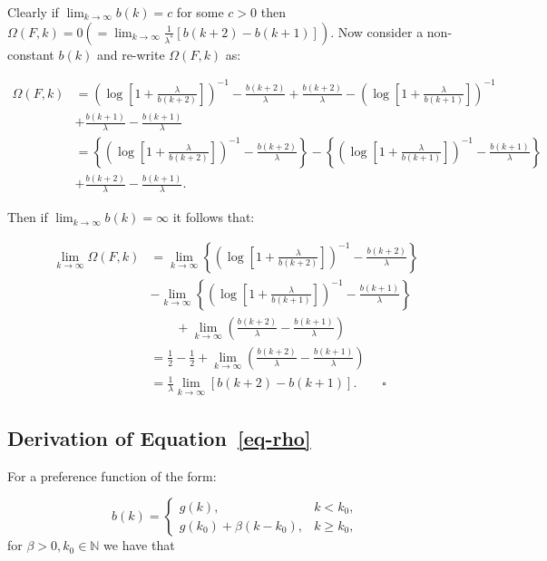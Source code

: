 \documentclass[
  sn-basic,
]{sn-jnl}
\theoremstyle{plain}
\theoremstyle{plain}
\theoremstyle{remark}
\begin{document}
Clearly if \(\lim_{k\rightarrow\infty}b(k)=c\) for some \(c>0\) then
\(\Omega(F,k)= 0 (= \lim_{k\rightarrow\infty}\frac{1}{\lambda^{*}} [b(k+2)-b(k+1)])\).
Now consider a non-constant \(b(k)\) and re-write \(\Omega(F,k)\) as:

\begin{align*}
\Omega(F,k) &= \left(\log\left[1+\frac{\lambda}{b(k+2)}\right]\right)^{-1}-\frac{b(k+2)}{\lambda}+\frac{b(k+2)}{\lambda}-\left(\log\left[1+\frac{\lambda}{b(k+1)}\right]\right)^{-1}\\&+\frac{b(k+1)}{\lambda}  -\frac{b(k+1)}{\lambda}\\
&=\left\{ \left(\log\left[1+\frac{\lambda}{b(k+2)}\right]\right)^{-1}-\frac{b(k+2)}{\lambda}\right\} - \left\{ \left(\log\left[1+\frac{\lambda}{b(k+1)}\right]\right)^{-1}-\frac{b(k+1)}{\lambda}\right\}\\&+\frac{b(k+2)}{\lambda}-\frac{b(k+1)}{\lambda}.
\end{align*}

Then if \(\lim_{k\rightarrow\infty}b(k)=\infty\) it follows that:

\begin{align*}
\lim_{k\rightarrow\infty}\Omega(F,k) &= \lim_{k\rightarrow\infty}\left\{ \left(\log\left[1+\frac{\lambda}{b(k+2)}\right]\right)^{-1}-\frac{b(k+2)}{\lambda}\right\} \\&- \lim_{k\rightarrow\infty}\left\{ \left(\log\left[1+\frac{\lambda}{b(k+1)}\right]\right)^{-1}-\frac{b(k+1)}{\lambda}\right\}\\
&\qquad+\lim_{k\rightarrow\infty}\left(\frac{b(k+2)}{\lambda}-\frac{b(k+1)}{\lambda}\right)\\
&=\frac{1}{2}-\frac{1}{2} + \lim_{k\rightarrow\infty}\left(\frac{b(k+2)}{\lambda}-\frac{b(k+1)}{\lambda}\right)\\
&=\frac{1}{\lambda}\lim_{k\rightarrow\infty}\left[b(k+2)-b(k+1)\right].\qquad \square
\end{align*}

\subsection{\texorpdfstring{Derivation of
Equation~\ref{eq-rho}}{Derivation of Equation~}}\label{derivation-of-eq-rho}

For a preference function of the form:

\[
b(k) = \begin{cases}
g(k),&k<k_0,\\
g(k_0) + \beta(k-k_0), &k\ge k_0,
\end{cases}
\] for \(\beta>0, k_0\in\mathbb N\) we have that
\end{document}
